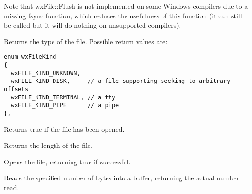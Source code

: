 Note that wxFile::Flush is not implemented on some Windows compilers
due to a missing fsync function, which reduces the usefulness of this function
(it can still be called but it will do nothing on unsupported compilers).


\label{wxfilegetfilekind}


Returns the type of the file. Possible return values are:

\begin{verbatim}
enum wxFileKind
{
  wxFILE_KIND_UNKNOWN,
  wxFILE_KIND_DISK,     // a file supporting seeking to arbitrary offsets
  wxFILE_KIND_TERMINAL, // a tty
  wxFILE_KIND_PIPE      // a pipe
};

\end{verbatim}


\label{wxfileisopened}


Returns true if the file has been opened.


\label{wxfilelength}


Returns the length of the file.


\label{wxfileopen}


Opens the file, returning true if successful.





\label{wxfileread}


Reads the specified number of bytes into a buffer, returning the actual number read.





